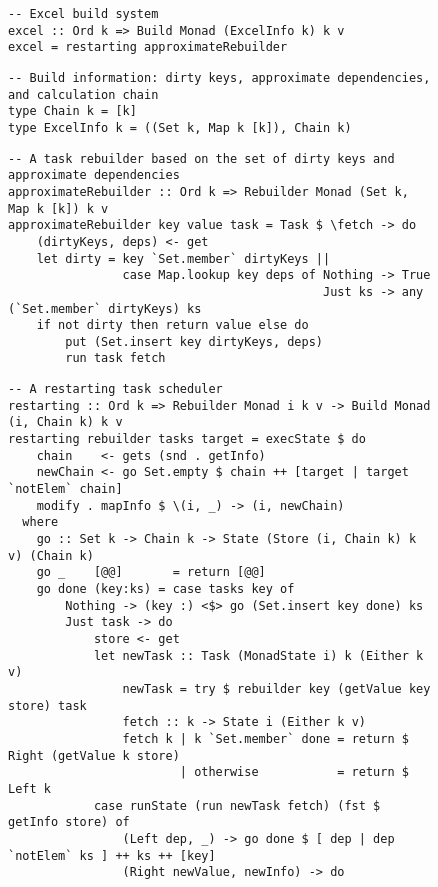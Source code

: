 \begin{figure}
\begin{verbatim}
-- Excel build system
excel :: Ord k => Build Monad (ExcelInfo k) k v
excel = restarting approximateRebuilder
\end{verbatim}
\vspace{0mm}
\begin{verbatim}
-- Build information: dirty keys, approximate dependencies, and calculation chain
type Chain k = [k]
type ExcelInfo k = ((Set k, Map k [k]), Chain k)
\end{verbatim}
\vspace{0mm}
\begin{verbatim}
-- A task rebuilder based on the set of dirty keys and approximate dependencies
approximateRebuilder :: Ord k => Rebuilder Monad (Set k, Map k [k]) k v
approximateRebuilder key value task = Task $ \fetch -> do
    (dirtyKeys, deps) <- get
    let dirty = key `Set.member` dirtyKeys ||
                case Map.lookup key deps of Nothing -> True
                                            Just ks -> any (`Set.member` dirtyKeys) ks
    if not dirty then return value else do
        put (Set.insert key dirtyKeys, deps)
        run task fetch
\end{verbatim}
\vspace{0mm}
\begin{verbatim}
-- A restarting task scheduler
restarting :: Ord k => Rebuilder Monad i k v -> Build Monad (i, Chain k) k v
restarting rebuilder tasks target = execState $ do
    chain    <- gets (snd . getInfo)
    newChain <- go Set.empty $ chain ++ [target | target `notElem` chain]
    modify . mapInfo $ \(i, _) -> (i, newChain)
  where
    go :: Set k -> Chain k -> State (Store (i, Chain k) k v) (Chain k)
    go _    [@@]       = return [@@]
    go done (key:ks) = case tasks key of
        Nothing -> (key :) <$> go (Set.insert key done) ks
        Just task -> do
            store <- get
            let newTask :: Task (MonadState i) k (Either k v)
                newTask = try $ rebuilder key (getValue key store) task
                fetch :: k -> State i (Either k v)
                fetch k | k `Set.member` done = return $ Right (getValue k store)
                        | otherwise           = return $ Left k
            case runState (run newTask fetch) (fst $ getInfo store) of
                (Left dep, _) -> go done $ [ dep | dep `notElem` ks ] ++ ks ++ [key]
                (Right newValue, newInfo) -> do

\end{verbatim}
\end{figure}
